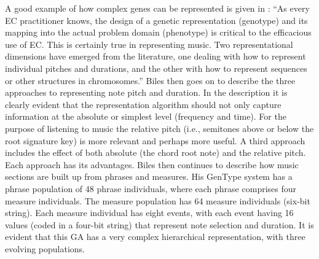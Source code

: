 A good example of how complex genes can be represented is given in \cite{Biles2007}: 
``As every EC practitioner knows, the design of a genetic representation (genotype)
and its mapping into the actual problem domain (phenotype) is critical to the efficacious
use of EC. This is certainly true in representing music. Two representational
dimensions have emerged from the literature, one dealing with how to represent
individual pitches and durations, and the other with how to represent sequences or
other structures in chromosomes.'' Biles then goes on to describe the three approaches to representing note pitch and duration. In the description it is clearly evident that the representation algorithm should not only capture information at the absolute or simplest level (frequency and time). For the purpose of listening to music the relative pitch (i.e., semitones above or below the root signature key) is more relevant and perhaps more useful. A third approach includes the effect of both absolute (the chord root note) and the relative pitch. Each approach has its advantages. Biles then continues to describe \cite{Bilesb2007} how music sections are built up from phrases and measures.  His GenType system has a phrase population of 48 phrase individuals, where each phrase comprises four measure individuals.  The measure population has 64 measure individuals (six-bit string). Each measure individual has eight events, with each event having 16 values (coded in a four-bit string) that represent note selection and duration.
It is evident that this GA has a very complex hierarchical representation, with three evolving populations.


